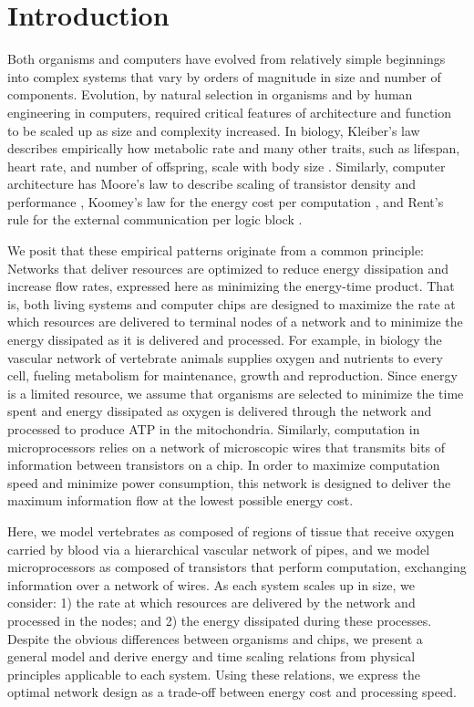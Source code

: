 \documentclass[12pt]{article}
\begin{document}
\newpage

\section{Introduction}
\label{sec:intro}

Both organisms and computers have evolved from relatively simple beginnings
into complex systems that vary by orders of magnitude in size and number of
components. Evolution, by natural selection in organisms and by human
engineering in computers, required critical features of architecture and
function to be scaled up as size and complexity increased. In biology,
Kleiber's law describes empirically how metabolic rate and many
other traits, such as lifespan, heart rate, and number of offspring, scale with body
size \cite{kleiber47}.  Similarly, computer architecture has Moore's law to
describe scaling of transistor density and performance \cite{moore98}, Koomey's
law for the energy cost per computation \cite{koomey11}, and Rent's rule for
the external communication per logic block \cite{christie00}.

We posit that these empirical patterns originate from a common principle:
Networks that deliver resources are optimized to reduce energy dissipation and
increase flow rates, expressed here as minimizing the energy-time product. That
is, both living systems and computer chips are designed to maximize the rate at
which resources are delivered to terminal nodes of a network and to minimize
the energy dissipated as it is delivered and processed.  For example, in biology the vascular network of vertebrate
animals supplies oxygen and nutrients to every cell, fueling metabolism for
maintenance, growth and reproduction.  Since energy is a limited resource, we
assume that organisms are selected to minimize the time spent and energy dissipated as oxygen is delivered through the network \cite{west97} and processed to produce ATP in the mitochondria. Similarly, computation in microprocessors relies on a
network of microscopic wires that transmits bits of information between
transistors on a chip.  In order to maximize computation speed and minimize
power consumption, this network is designed to deliver the maximum information
flow at the lowest possible energy cost.

Here, we model vertebrates as composed of regions of tissue that receive oxygen
carried by blood via a hierarchical vascular network of pipes, and we model
microprocessors as composed of transistors that perform computation, exchanging
information over a network of wires.  As each system scales up in size,
we consider: 1) the rate at which resources are delivered by the network and
processed in the nodes; and 2) the energy dissipated during these processes.
Despite the obvious differences between organisms and chips, we present a
general model and derive energy and time scaling relations from physical
principles applicable to each system. Using these relations, we express the
optimal network design as a trade-off between energy cost and processing speed. 
\end{document}
